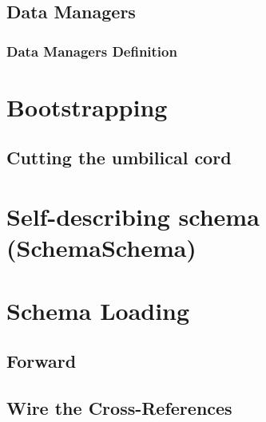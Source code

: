 \subsection{Data Managers}\label{sec:Data Manager Implementation}

\subsubsection{Data Managers Definition}\label{Data Managers Definition}

\section{Bootstrapping}\label{sec:Bootstrapping}

\subsection{Cutting the umbilical cord}\label{subsec:Cutting the umbilical cord}

\section{Self-describing schema (SchemaSchema)}\label{sec:SchemaSchema}

\section{Schema Loading}\label{sec:Schema Loading}

\subsection{Forward}\label{subsec:Schema Loading Forward}

\subsection{Wire the Cross-References}\label{subsec:Schema Loading Wire the Cross-References}

